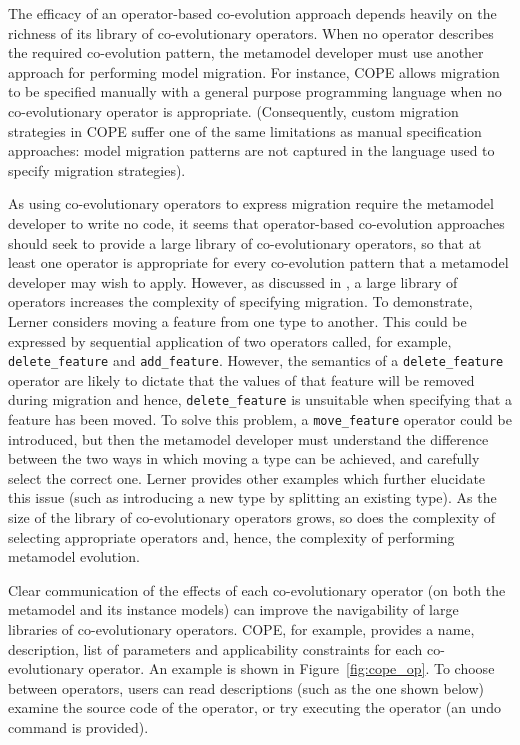 The efficacy of an operator-based co-evolution approach depends heavily on the richness of its library of co-evolutionary operators. When no operator describes the required co-evolution pattern, the metamodel developer must use another approach for performing model migration. For instance, COPE allows migration to be specified manually with a general purpose programming language when no co-evolutionary operator is appropriate. (Consequently, custom migration strategies in COPE suffer one of the same limitations as manual specification approaches: model migration patterns are not captured in the language used to specify migration strategies).

As using co-evolutionary operators to express migration require the metamodel developer to write no code, it seems that operator-based co-evolution approaches should seek to provide a large library of co-evolutionary operators, so that at least one operator is appropriate for every co-evolution pattern that a metamodel developer may wish to apply. However, as discussed in \cite{lerner00model}, a large library of operators increases the complexity of specifying migration. To demonstrate, Lerner considers moving a feature from one type to another. This could be expressed by sequential application of two operators called, for example, \texttt{delete\_feature} and \texttt{add\_feature}. However, the semantics of a \texttt{delete\_feature} operator are likely to dictate that the  values of that feature will be removed during migration and hence, \texttt{delete\_feature} is unsuitable when specifying that a feature has been moved. To solve this problem, a \texttt{move\_feature} operator could be introduced, but then the metamodel developer must understand the difference between the two ways in which moving a type can be achieved, and carefully select the correct one. Lerner provides other examples which further elucidate this issue (such as introducing a new type by splitting an existing type). As the size of the library of co-evolutionary operators grows, so does the complexity of selecting appropriate operators and, hence, the complexity of performing metamodel evolution.

Clear communication of the effects of each co-evolutionary operator (on both the metamodel and its instance models) can improve the navigability of large libraries of co-evolutionary operators. COPE, for example, provides a name, description, list of parameters and applicability constraints for each co-evolutionary operator. An example is shown in Figure~\ref{fig:cope_op}. To choose between operators, users can read descriptions (such as the one shown below) examine the source code of the operator, or try executing the operator (an undo command is provided).


